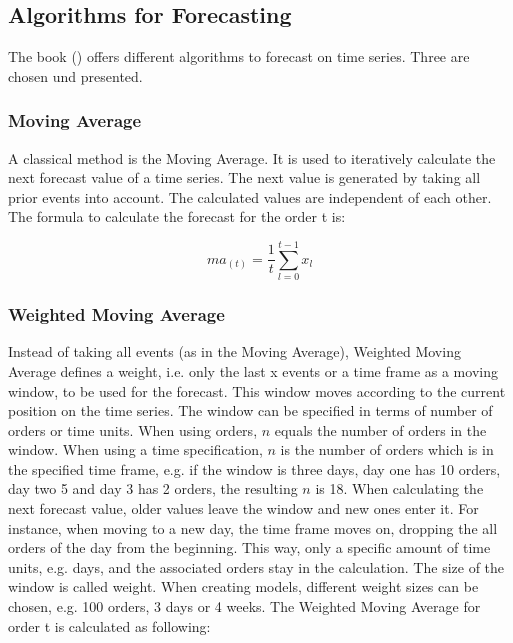 \subsection{Algorithms for Forecasting}\label{subsection:Algorithms for Forecasting}
The book (\cite{Hyndman.2013}) offers different algorithms to forecast on time series. Three are chosen und presented.
\subsubsection{Moving Average}\label{subsubsection:Moving Average}
A classical method is the Moving Average. It is used to iteratively calculate the next forecast value of a time series. The next value is generated by taking all prior events into account. The calculated values are independent of each other.\newline
The formula to calculate the forecast for the order t is:
\begin{center}
\begin{equation}
ma_{(t)}= \frac{1}{t}\sum^{t-1}_{l = 0} x_{l}
\end{equation}
\end{center}

\subsubsection{Weighted Moving Average}\label{subsubsection:Weighted Moving Average}
Instead of taking all events (as in the Moving Average), Weighted Moving Average defines a weight, i.e. only the last x events or a time frame  as a moving window, to be used for the forecast. This window moves according to the current position on the time series. The window can be specified in terms of number of orders or time units. When using orders, $n$ equals the number of orders in the window. When using a time specification, $n$ is the number of orders which is in the specified time frame, e.g. if the window is three days, day one has 10 orders, day two 5 and day 3 has 2 orders, the resulting $n$ is 18. When calculating the next forecast value, older values leave the window and new ones enter it. For instance, when moving to a new day, the time frame moves on, dropping the all orders of the day from the beginning. This way, only a specific amount of time units, e.g. days, and the associated orders stay in the calculation. The size of the window is called weight. When creating models, different weight sizes can be chosen, e.g. 100 orders, 3 days or 4 weeks.\newline
The Weighted Moving Average for order t is calculated as following:

